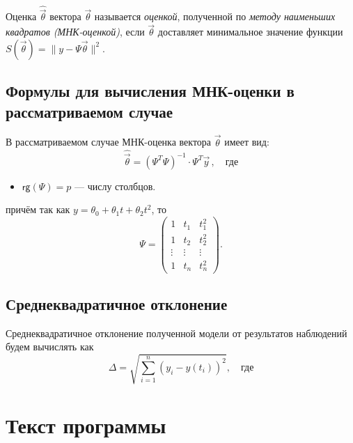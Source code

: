 \begin{defn}
    Оценка $\hat{\vec{\theta}}$ вектора $\vec{\theta}$ называется \emph{оценкой}, полученной по \emph{методу наименьших квадратов (МНК-оценкой)}, если $\vec{\theta}$ доставляет минимальное значение функции $S(\vec{\theta}) = \|y - \Psi \vec{\theta}\|^2$.
\end{defn}


\subsection{Формулы для вычисления МНК-оценки в рассматриваемом случае}

В рассматриваемом случае МНК-оценка вектора $\vec{\theta}$ имеет вид:
\begin{equation}
    \hat{\vec{\theta}} = (\Psi^T \Psi)^{-1} \cdot \Psi^T \vec{y}\,, \quad \text{где}
\end{equation}
\begin{itemize}
    \item $\mathsf{rg}(\Psi) = p$ --- числу столбцов.
\end{itemize}
причём так как $y = \theta_0 + \theta_1 t + \theta_2 t^2$, то
\begin{equation}
    \Psi = \begin{pmatrix}
        1      & t_1    & t_1^2  \\
        1      & t_2    & t_2^2  \\
        \vdots & \vdots & \vdots \\
        1      & t_n    & t_n^2
    \end{pmatrix}.
\end{equation}


\subsection{Среднеквадратичное отклонение}

Среднеквадратичное отклонение полученной модели от результатов наблюдений будем вычислять как
\begin{equation}
    \Delta = \sqrt{\sum_{i=1}^{n}\left(y_i - y(t_i)\right)^2}, \quad \text{где}
\end{equation}



\section{Текст программы}




